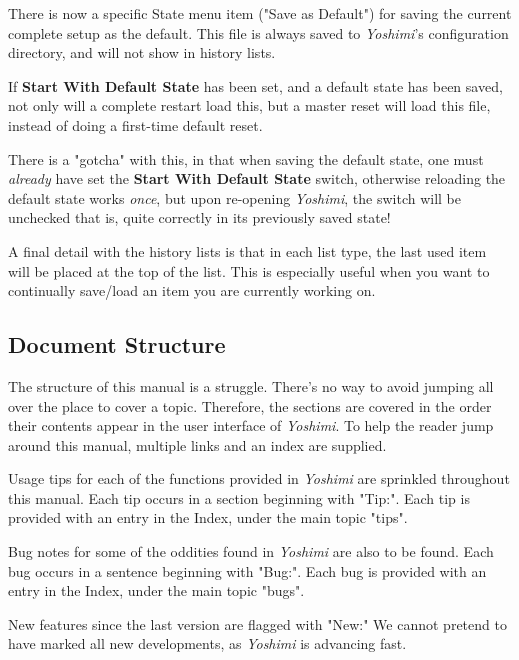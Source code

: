 \documentclass[
 11pt,
 twoside,
 a4paper,
 final                                 %
]{article}
\begin{document}
   There is now a specific State menu item ("Save as Default") for saving
   the current complete setup as the default. This file is always saved to
   \textsl{Yoshimi}'s configuration directory,
   and will not show in history lists.

   If \textbf{Start With Default State} has been set, and a
   default state has been saved, not only will a complete restart load this,
   but a master reset will load this file, instead of doing a
   first-time default reset.

   There is a "gotcha" with this, in that when saving the default state,
   one must \textsl{already} have set the \textbf{Start With Default State}
   switch, otherwise reloading
   the default state works \textsl{once}, but upon re-opening
   \textsl{Yoshimi}, the switch will be
   unchecked \textemdash that is, quite correctly in its previously saved state!

   A final detail with the history lists is that in each list type, the last
   used item will be placed at the top of the list. This is especially useful
   when you want to continually save/load an item you are currently working on.

\subsection{Document Structure}
\label{subsec:introduction_document_structure}

   The structure of this manual is a struggle.
   There's no way to avoid jumping all over the place to
   cover a topic.  Therefore, the sections are covered
   in the order their contents appear in the user interface of
   \textsl{Yoshimi}.  To help the reader jump around this manual, multiple
   links and an index are supplied.

   Usage tips
   for each of the functions provided in
   \textsl{Yoshimi} are sprinkled throughout this manual.
   Each tip occurs in a section beginning with "Tip:".
   Each tip is provided with an entry in the Index, under the
   main topic "tips".

   Bug notes for some of the oddities found in \textsl{Yoshimi} are also to be
   found.  Each bug occurs in a sentence beginning with "Bug:".  Each bug is
   provided with an entry in the Index, under the main topic "bugs".

   New features
   since the last version are flagged with "New:"  We cannot pretend to have
   marked all new developments, as \textsl{Yoshimi} is advancing fast.
\end{document}
